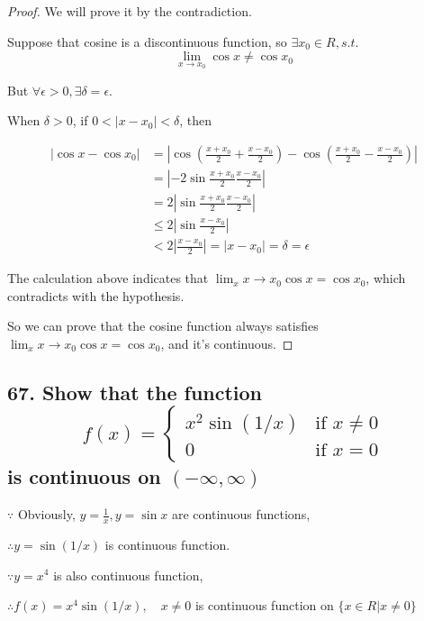 \documentclass{article}
\begin{document}
    \begin{proof}
        We will prove it by the contradiction.

        Suppose that cosine is a discontinuous function, so $\exists x_0 \in R, s.t.$ $$\lim_{x \to x_0}\cos x \not = \cos x_0$$

        But $\forall \epsilon > 0, \exists \delta = \epsilon$.

        When $\delta > 0$, if $0 < |x - x_0| < \delta$, then 
        
        $$
        \begin{aligned}
            |\cos x - \cos x_0| &= |\cos (\frac{x + x_0}{2} + \frac{x - x_0}{2}) - \cos(\frac{x + x_0}{2} - \frac{x - x_0}{2}) | \\
            &= |-2\sin \frac{x + x_0}{2} \frac{x - x_0}{2} | \\
            &= 2|\sin \frac{x + x_0}{2} \frac{x - x_0}{2} | \\
            &\leq 2 |\sin \frac{x - x_0}{2} | \\
            &< 2 |\frac{x - x_0}{2}| = |x - x_0| = \delta = \epsilon
        \end{aligned}
        $$

        The calculation above indicates that $\lim_x{x \to x_0}\cos x = \cos x_0$, which contradicts with the hypothesis.

        So we can prove that the cosine function always satisfies $\lim_x{x \to x_0}\cos x = \cos x_0$, and it's continuous.

    \end{proof}

    \subsection*{67. Show that the function $$f(x) = \left\{ \begin{array}{ll} x^2\sin(1/x) & \textrm{if $x \not = 0$} \\ 0 & \textrm{if $x = 0$} \end{array} \right.$$ is continuous on $(-\infty, \infty)$}

    $\because$ Obviously, $y = \frac 1 x, y = \sin x$ are continuous functions,

    $\therefore y = \sin(1/x)$ is continuous function.

    $\because y = x^4$ is also continuous function,

    $\therefore f(x) = x^4\sin(1/x), \quad x \not = 0$ is continuous function on $\{x \in R|x \not = 0\}$
\end{document}
